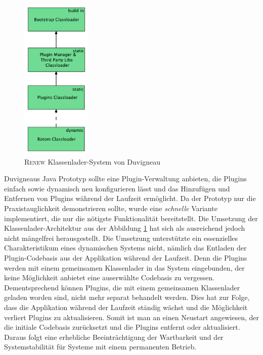 		\begin{figure}[h!]
		\centering
			\includegraphics[width=0.3\textwidth]{material/images/Classloader-Hierarhie-Renew.pdf}
			\caption{\textsc{Renew} Klassenlader-System von Duvigneau \cite{Duvigneau09}}
			\label{fig:classLoadDuv}
		\end{figure}\bigbreak
		Duvigneaus Java Prototyp \cite{Duvigneau09} sollte eine Plugin-Verwaltung anbieten, die Plugins einfach sowie dynamisch neu konfigurieren lässt und das Hinzufügen und Entfernen von Plugins während der Laufzeit ermöglicht. Da der Prototyp nur die Praxistauglichkeit demonstrieren sollte, wurde eine \textit{schnelle} Variante implementiert, die nur die nötigste Funktionalität bereitstellt. Die Umsetzung der Klassenlader-Architektur aus der Abbildung \ref{fig:classLoadDuv} hat sich als ausreichend jedoch nicht mängelfrei herausgestellt. Die Umsetzung unterstützte ein essenzielles Charakteristikum eines dynamischen Systems nicht, nämlich das Entladen der Plugin-Codebasis aus der Applikation während der Laufzeit. Denn die Plugins werden mit einem gemeinsamen Klassenlader in das System eingebunden, der keine Möglichkeit anbietet eine auserwählte Codebasis zu vergessen. Dementsprechend können Plugins, die mit einem gemeinsamen Klassenlader geladen worden sind, nicht mehr separat behandelt werden. Dies hat zur Folge, dass die Applikation während der Laufzeit ständig wächst und die Möglichkeit verliert Plugins zu aktualisieren. Somit ist man an einen Neustart angewiesen, der die initiale Codebasis zurücksetzt und die Plugins entfernt oder aktualisiert. Daraus folgt eine erhebliche Beeinträchtigung der Wartbarkeit und der Systemstabilität für Systeme mit einem permanenten Betrieb. \bigbreak

